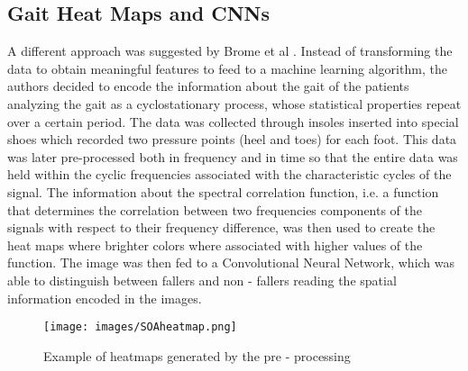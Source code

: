 \subsection{Gait Heat Maps and CNNs}
A different approach was suggested by Brome et al \cite{CycloStationary}. Instead of transforming the data to obtain meaningful features to feed to a machine learning algorithm, the authors decided to encode the information about the gait of the patients analyzing the gait as a cyclostationary process, whose statistical properties repeat over a certain period.
The data was collected through insoles inserted into special shoes which recorded two pressure points (heel and toes) for each foot. This data was later pre-processed both in frequency and in time so that the entire data was held within the cyclic frequencies associated with the characteristic cycles of the signal. 
The information about the spectral correlation function, i.e. a function that determines the correlation between two frequencies components of the signals with respect to their frequency difference, was then used to create the heat maps where brighter colors where associated with higher values of the function. The image was then fed to a Convolutional Neural Network, which was able to distinguish between fallers and non - fallers reading the spatial information encoded in the images.

\begin{figure}[ht!]
    \centering
    \texttt{[image: images/SOAheatmap.png]}
    \caption{Example of heatmaps generated by the pre - processing}
    \label{fig:SOAheatmap}
\end{figure}

